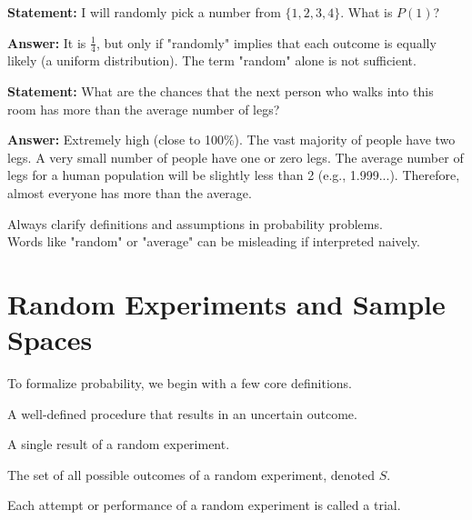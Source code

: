 \begin{eg}
\textbf{Statement:} I will randomly pick a number from $\{1, 2, 3, 4\}$. What is $P(1)$?  

\textbf{Answer:} It is $\frac{1}{4}$, but only if "randomly" implies that each outcome is equally likely (a uniform distribution). The term "random" alone is not sufficient.
\end{eg}

\begin{eg}
\textbf{Statement:} What are the chances that the next person who walks into this room has more than the average number of legs?  

\textbf{Answer:} Extremely high (close to 100\%). The vast majority of people have two legs. A very small number of people have one or zero legs. The average number of legs for a human population will be slightly less than 2 (e.g., 1.999...). Therefore, almost everyone has more than the average.
\end{eg}

\begin{remark}
Always clarify definitions and assumptions in probability problems. \\
Words like "random" or "average" can be misleading if interpreted naively.
\end{remark}
\section{Random Experiments and Sample Spaces}

To formalize probability, we begin with a few core definitions.

\begin{definition}
A well-defined procedure that results in an uncertain outcome.
\end{definition}

\begin{definition}[Outcome]
A single result of a random experiment.
\end{definition}

\begin{definition}
The set of all possible outcomes of a random experiment, denoted $S$.
\end{definition}

\begin{definition}[Trial]
Each attempt or performance of a random experiment is called a trial.
\end{definition}

